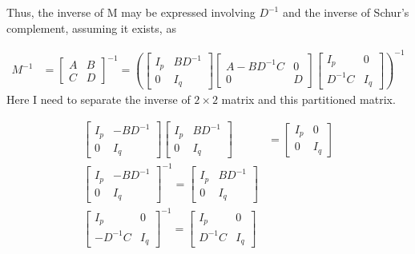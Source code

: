 \documentclass[11pt]{article} %
\begin{document}
Thus, the inverse of M may be expressed involving $D^{-1}$ and the inverse of Schur's complement, assuming it exists, as

\begin{align*}
	M^{-1} &= \begin{bmatrix}
		A & B \\
		C & D
	\end{bmatrix}^{-1} = \left(\begin{bmatrix}
	I_{p} & BD^{-1} \\
	0 & I_{q}
\end{bmatrix}  \begin{bmatrix}
A - BD^{-1}C & 0 \\
0 & D
\end{bmatrix}  \begin{bmatrix}
I_{p} & 0 \\
D^{-1}C & I_{q}
\end{bmatrix} \right)^{-1} 
\end{align*}
Here I need to separate the inverse of $2 \times 2$ matrix and this partitioned matrix. 

\begin{align*}
\begin{bmatrix}
		I_{p} & -BD^{-1} \\
		0 & I_{q}
	\end{bmatrix} \begin{bmatrix}
	I_{p} & BD^{-1} \\
0 & I_{q}
\end{bmatrix} &= \begin{bmatrix} 
I_{p} & 0 \\
0 & I_{q}
\end{bmatrix}\\
\begin{bmatrix}
	I_{p} & -BD^{-1} \\
	0 & I_{q}
\end{bmatrix}^{-1} = \begin{bmatrix}
I_{p} & BD^{-1} \\
0 & I_{q}
\end{bmatrix} \\
\begin{bmatrix}
	I_{p} & 0 \\
	-D^{-1}C & I_{q}
\end{bmatrix} ^{-1} = \begin{bmatrix}
I_{p} & 0 \\
D^{-1}C & I_{q}
\end{bmatrix} 
\end{align*}
\end{document}
